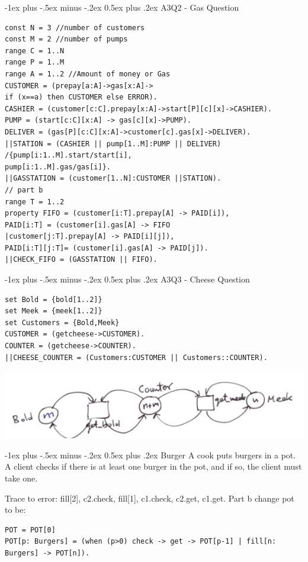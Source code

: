 \documentclass[letterpaper, 8pt]{extarticle}
\makeatletter
\renewcommand{\section}{\@startsection{section}{1}{0mm}%
                                {-1ex plus -.5ex minus -.2ex}%
                                {0.5ex plus .2ex}%
                                {\normalfont\normalsize\bfseries}}
\makeatother
\begin{document}
\begin{multicols*}{5}
\section{A3Q2 - Gas Question}
\begin{lstlisting}
const N = 3 //number of customers
const M = 2 //number of pumps
range C = 1..N
range P = 1..M
range A = 1..2 //Amount of money or Gas
CUSTOMER = (prepay[a:A]->gas[x:A]->
if (x==a) then CUSTOMER else ERROR).
CASHIER = (customer[c:C].prepay[x:A]->start[P][c][x]->CASHIER).
PUMP = (start[c:C][x:A] -> gas[c][x]->PUMP).
DELIVER = (gas[P][c:C][x:A]->customer[c].gas[x]->DELIVER).
||STATION = (CASHIER || pump[1..M]:PUMP || DELIVER)
/{pump[i:1..M].start/start[i],
pump[i:1..M].gas/gas[i]}.
||GASSTATION = (customer[1..N]:CUSTOMER ||STATION).
// part b
range T = 1..2
property FIFO = (customer[i:T].prepay[A] -> PAID[i]),
PAID[i:T] = (customer[i].gas[A] -> FIFO
|customer[j:T].prepay[A] -> PAID[i][j]),
PAID[i:T][j:T]= (customer[i].gas[A] -> PAID[j]).
||CHECK_FIFO = (GASSTATION || FIFO).
\end{lstlisting}

\section{A3Q3 - Cheese Question}
\begin{lstlisting}
set Bold = {bold[1..2]}
set Meek = {meek[1..2]}
set Customers = {Bold,Meek}
CUSTOMER = (getcheese->CUSTOMER).
COUNTER = (getcheese->COUNTER).
||CHEESE_COUNTER = (Customers:CUSTOMER || Customers::COUNTER).
\end{lstlisting}
\includegraphics[width = \linewidth]{COMPSCI-2SD3/a3q3.png}

\section{Burger}
A cook puts burgers in a pot. A client checks if there is at least one burger in the pot, and if so, the client must take one.

Trace to error: fill[2], c2.check, fill[1], c1.check, c2.get, c1.get. Part b change pot to be:
\begin{lstlisting}
POT = POT[0]
POT[p: Burgers] = (when (p>0) check -> get -> POT[p-1] | fill[n: Burgers] -> POT[n]).
\end{lstlisting}

\end{multicols*}
\end{document}
